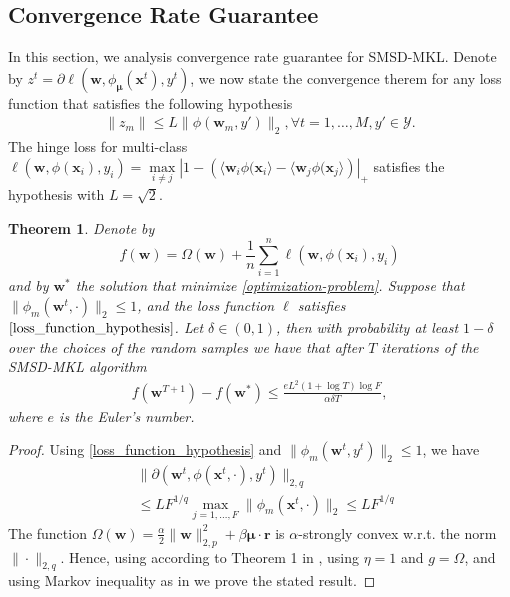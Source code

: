 \documentclass{article}
\newtheorem{theorem}{Theorem}
\begin{document}
\subsection{Convergence Rate Guarantee}
In this section, we analysis convergence rate guarantee for SMSD-MKL.
Denote by $z^t=\partial\ell(\pmb{w},\phi_{\bm \mu}(\mathbf{x}^t), y^t)$,
we now state the convergence therem for any loss function that satisfies the following hypothesis
\begin{align}
\label{loss_function_hypothesis}
    \|z_m\| \leq L\|\phi(\pmb{w}_m, y')\|_2, \forall t =1,\ldots, M, y' \in \mathcal{Y}.
\end{align}
The hinge loss for multi-class $\ell(\pmb{w},\phi(\mathbf{x}_i), y_i)=
\max\limits_{i \not= j}\left|1-\left(\langle\pmb{w}_i \phi(\mathbf{x}_i\rangle -\langle\pmb{w}_j \phi(\mathbf{x}_j\rangle\right)\right|_+$ satisfies the hypothesis with $L=\sqrt{2}$.

\begin{theorem}
Denote by $$f(\pmb{w})=\Omega(\pmb{w})+\frac{1}{n}\sum_{i=1}^n\ell(\pmb{w},\phi(\mathbf{x}_i),y_i)$$
and by $\pmb{w}^\ast$ the solution that minimize \eqref{optimization-problem}.
Suppose that $\|\phi_m(\pmb{w}^t,\cdot)\|_2 \leq 1$, and the loss function $\ell$ satisfies $\eqref{loss_function_hypothesis}$.
Let $\delta \in (0,1)$, then with probability at least $1 - \delta$ over the choices of the random samples
we have that after $T$ iterations of the SMSD-MKL algorithm
\begin{align*}
    f(\pmb{w}^{T+1})-f(\pmb{w}^\ast) \leq \frac{eL^2(1+\log T)\log F}{\alpha\delta T},
\end{align*}
where $e$ is the Euler's number.
\end{theorem}
\begin{proof}
Using \eqref{loss_function_hypothesis} and $\|\phi_m(\pmb{w}^t, y^t)\|_2 \leq 1$, we have
\begin{align*}
    &\|\partial(\pmb{w}^t,\phi(\mathbf{x}^t,\cdot), y^t)\|_{2,q} \\
    &\leq LF^{1/q} \max_{j=1, \ldots, F} \|\phi_m(\mathbf{x}^t, \cdot)\|_2 \leq LF^{1/q}
\end{align*}
The function $\Omega(\pmb{w})=\frac{\alpha}{2}\|\pmb{w}\|_{2,p}^2 + \beta\mathbf{\mu} \cdot \mathbf{r}$ is
 $\alpha$-strongly convex w.r.t. the norm $\|\cdot\|_{2,q}$. Hence, using according to Theorem 1 in \cite{Shalev-ShwartzSS07},
 using $\eta=1$ and $g=\Omega$, and using Markov inequality as in \cite{Shalev-ShwartzSS07} we prove the stated result.
\end{proof}
\end{document}
